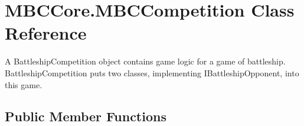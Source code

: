 \hypertarget{class_m_b_c_core_1_1_m_b_c_competition}{\section{M\-B\-C\-Core.\-M\-B\-C\-Competition Class Reference}
\label{class_m_b_c_core_1_1_m_b_c_competition}
}


A Battleship\-Competition object contains game logic for a game of battleship. Battleship\-Competition puts two classes, implementing I\-Battleship\-Opponent, into this game. 


\subsection*{Public Member Functions}
